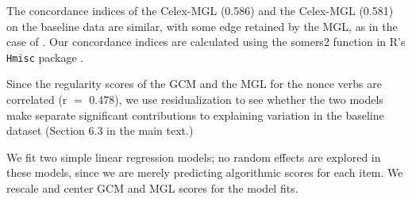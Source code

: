 \documentclass[12pt]{article}
\begin{document}
The concordance indices of the Celex-MGL (0.586) and the Celex-MGL (0.581) on the baseline data are similar, with some edge retained by the MGL, as in the case of \citep{albright2003rules}. Our concordance indices are calculated using the somers2 function in R's \texttt{Hmisc} package \citep{harrell2014hmisc}. 

Since the regularity scores of the GCM and the MGL for the nonce verbs are correlated  (r $=$ 0.478), we use residualization to see whether the two models make separate significant contributions to explaining variation in the baseline dataset (Section 6.3 in the main text.)

We fit two simple linear regression models; no random effects are explored in these models, since we are merely predicting algorithmic scores for each item. We rescale and center GCM and MGL scores for the model fits. 
\end{document}
